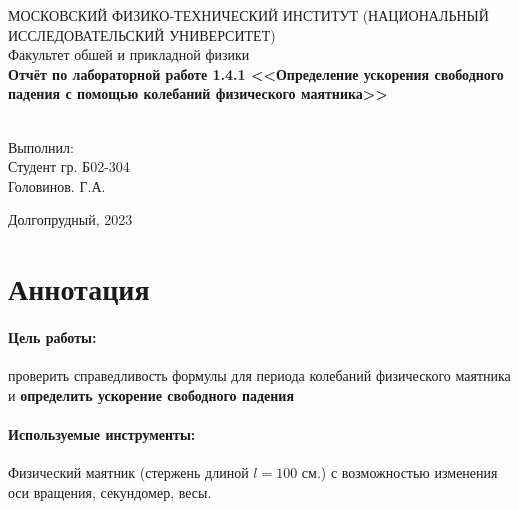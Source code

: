 \documentclass[a4paper,12pt]{article}
\begin{document}
	\begin{center}
		МОСКОВСКИЙ ФИЗИКО-ТЕХНИЧЕСКИЙ ИНСТИТУТ (НАЦИОНАЛЬНЫЙ ИССЛЕДОВАТЕЛЬСКИЙ УНИВЕРСИТЕТ) \\
		
		
		\hfill \break
		Факультет обшей и прикладной физики\\
		\vspace{2.5cm}
		\large{\textbf{Отчёт по лабораторной работе 1.4.1 <<Определение ускорения свободного падения с помощью колебаний физического маятника>>}}\\
		\hfill \break
		\\
	\end{center}
	
	\vspace{5cm}
	
	\begin{flushright}
		Выполнил:\\
		Студент гр. Б02-304\\
		Головинов. Г.А.
	\end{flushright}
	
	\vfill
	
	
	\begin{center} Долгопрудный, 2023 \end{center}
	
	\thispagestyle{empty}
	\newpage
	
	\section{Аннотация}
	\paragraph{Цель работы:} \hspace{-4mm} проверить справедливость формулы для периода колебаний физического маятника и \textbf{определить ускорение свободного падения}
	\paragraph{Используемые инструменты:} \hspace{-4mm} Физический маятник (стержень длиной $l=100$ см.) с возможностью изменения оси вращения, секундомер, весы.
\end{document}
